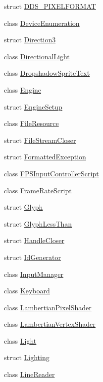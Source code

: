 \begin{DoxyCompactItemize}
struct \hyperlink{structmage_1_1_d_d_s___p_i_x_e_l_f_o_r_m_a_t}{D\+D\+S\+\_\+\+P\+I\+X\+E\+L\+F\+O\+R\+M\+AT}
\item 
class \hyperlink{classmage_1_1_device_enumeration}{Device\+Enumeration}
\item 
struct \hyperlink{structmage_1_1_direction3}{Direction3}
\item 
class \hyperlink{classmage_1_1_directional_light}{Directional\+Light}
\item 
class \hyperlink{classmage_1_1_dropshadow_sprite_text}{Dropshadow\+Sprite\+Text}
\item 
class \hyperlink{classmage_1_1_engine}{Engine}
\item 
struct \hyperlink{structmage_1_1_engine_setup}{Engine\+Setup}
\item 
class \hyperlink{classmage_1_1_file_resource}{File\+Resource}
\item 
struct \hyperlink{structmage_1_1_file_stream_closer}{File\+Stream\+Closer}
\item 
struct \hyperlink{structmage_1_1_formatted_exception}{Formatted\+Exception}
\item 
class \hyperlink{classmage_1_1_f_p_s_input_controller_script}{F\+P\+S\+Input\+Controller\+Script}
\item 
class \hyperlink{classmage_1_1_frame_rate_script}{Frame\+Rate\+Script}
\item 
struct \hyperlink{structmage_1_1_glyph}{Glyph}
\item 
struct \hyperlink{structmage_1_1_glyph_less_than}{Glyph\+Less\+Than}
\item 
struct \hyperlink{structmage_1_1_handle_closer}{Handle\+Closer}
\item 
struct \hyperlink{structmage_1_1_id_generator}{Id\+Generator}
\item 
class \hyperlink{classmage_1_1_input_manager}{Input\+Manager}
\item 
class \hyperlink{classmage_1_1_keyboard}{Keyboard}
\item 
class \hyperlink{classmage_1_1_lambertian_pixel_shader}{Lambertian\+Pixel\+Shader}
\item 
class \hyperlink{classmage_1_1_lambertian_vertex_shader}{Lambertian\+Vertex\+Shader}
\item 
class \hyperlink{classmage_1_1_light}{Light}
\item 
struct \hyperlink{structmage_1_1_lighting}{Lighting}
\item 
class \hyperlink{classmage_1_1_line_reader}{Line\+Reader}
\item 

\end{DoxyCompactItemize}
